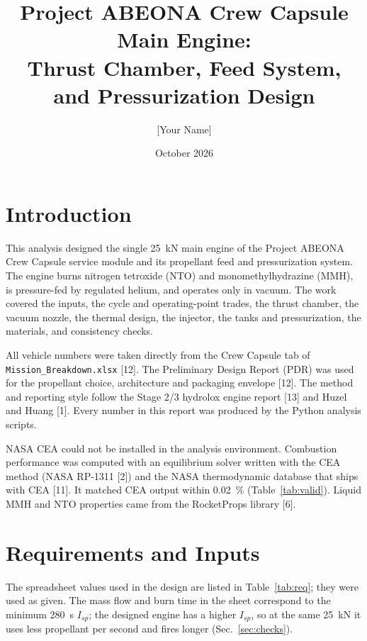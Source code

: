 \documentclass[10pt]{article}
\title{Project ABEONA Crew Capsule Main Engine:\\Thrust Chamber, Feed System, and Pressurization Design}
\author{[Your Name]}
\date{October 2026}
\begin{document}
\maketitle

\section{Introduction}
This analysis designed the single 25~kN main engine of the Project ABEONA Crew Capsule service module and its
propellant feed and pressurization system. The engine burns nitrogen tetroxide (NTO) and monomethylhydrazine (MMH),
is pressure-fed by regulated helium, and operates only in vacuum. The work covered the inputs, the cycle and
operating-point trades, the thrust chamber, the vacuum nozzle, the thermal design, the injector, the tanks and
pressurization, the materials, and consistency checks.

All vehicle numbers were taken directly from the Crew Capsule tab of \texttt{Mission\_Breakdown.xlsx} [12]. The
Preliminary Design Report (PDR) was used for the propellant choice, architecture and packaging envelope [12]. The method
and reporting style follow the Stage 2/3 hydrolox engine report [13] and Huzel and Huang [1]. Every number in this
report was produced by the Python analysis scripts.

NASA CEA could not be installed in the analysis environment. Combustion performance was computed with an equilibrium
solver written with the CEA method (NASA RP-1311 [2]) and the NASA thermodynamic database that ships with CEA [11]. It
matched CEA output within 0.02~\% (Table~\ref{tab:valid}). Liquid MMH and NTO properties came from the RocketProps
library [6].

\section{Requirements and Inputs}
The spreadsheet values used in the design are listed in Table~\ref{tab:req}; they were used as given. The mass flow and
burn time in the sheet correspond to the minimum 280~s $I_{sp}$; the designed engine has a higher $I_{sp}$, so at the same
25~kN it uses less propellant per second and fires longer (Sec.~\ref{sec:checks}).
\end{document}
